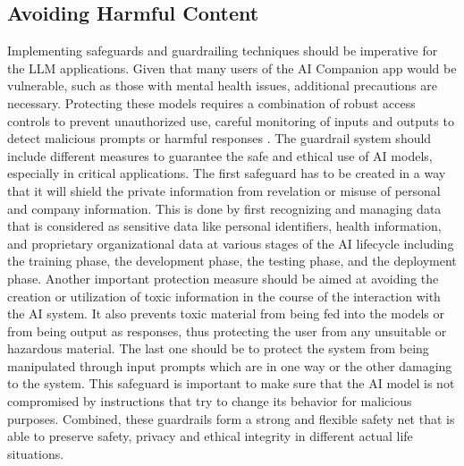 \subsection{Avoiding Harmful Content}
Implementing safeguards and guardrailing techniques \cite{biswas2023guardrails} should be imperative for the LLM applications. Given that many users of the AI Companion app would be vulnerable, such as those with mental health issues, additional precautions are necessary. Protecting these models requires a combination of robust access controls to prevent unauthorized use, careful monitoring of inputs and outputs to detect malicious prompts or harmful responses \cite{ayyamperumal2024current}. The guardrail system should include different measures to guarantee the safe and ethical use of AI models, especially in critical applications. The first safeguard has to be created in a way that it will shield the private information from revelation or misuse of personal and company information. This is done by first recognizing and managing data that is considered as sensitive data like personal identifiers, health information, and proprietary organizational data at various stages of the AI lifecycle including the training phase, the development phase, the testing phase, and the deployment phase. Another important protection measure should be aimed at avoiding the creation or utilization of toxic information in the course of the interaction with the AI system. It also prevents toxic material from being fed into the models or from being output as responses, thus protecting the user from any unsuitable or hazardous material. The last one should be to protect the system from being manipulated through input prompts which are in one way or the other damaging to the system. This safeguard is important to make sure that the AI model is not compromised by instructions that try to change its behavior for malicious purposes. Combined, these guardrails form a strong and flexible safety net that is able to preserve safety, privacy and ethical integrity in different actual life situations.
